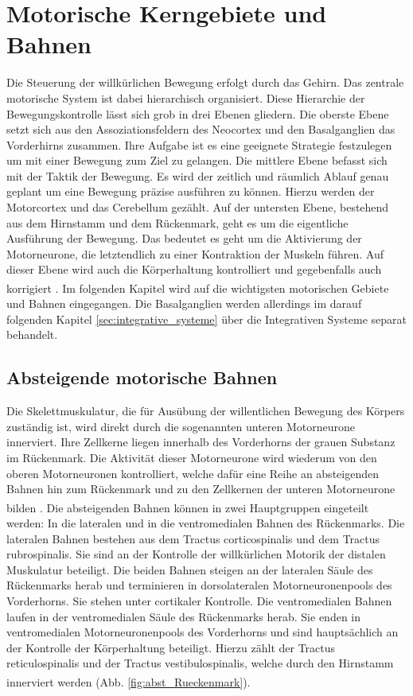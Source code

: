 \documentclass[12pt,a4paper,pdftex]{article}
\begin{document}
\newpage
\section{Motorische Kerngebiete und Bahnen}  \label{sec:Motorik}
Die Steuerung der willkürlichen Bewegung erfolgt durch das Gehirn. Das zentrale motorische System ist dabei hierarchisch organisiert. Diese Hierarchie der Bewegungskontrolle lässt sich grob in drei Ebenen gliedern. Die oberste Ebene setzt sich aus den Assoziationsfeldern des Neocortex und den Basalganglien das Vorderhirns zusammen. Ihre Aufgabe ist es eine geeignete Strategie festzulegen um mit einer Bewegung zum Ziel zu gelangen. Die mittlere Ebene befasst sich mit der Taktik der Bewegung. Es wird der zeitlich und räumlich Ablauf genau geplant um eine Bewegung präzise ausführen zu können. Hierzu werden der Motorcortex und das Cerebellum gezählt. Auf der untersten Ebene, bestehend aus dem Hirnstamm und dem Rückenmark, geht es um die eigentliche Ausführung der Bewegung. Das bedeutet es geht um die Aktivierung der Motorneurone, die letztendlich zu einer Kontraktion der Muskeln führen. Auf dieser Ebene wird auch die Körperhaltung kontrolliert und gegebenfalls auch korrigiert \textsuperscript{\cite[14]{neurowissenschaften_baer}}. Im folgenden Kapitel wird auf die wichtigsten motorischen Gebiete und Bahnen eingegangen. Die Basalganglien werden allerdings im darauf folgenden Kapitel \ref{sec:integrative_systeme} über die Integrativen Systeme separat behandelt.       

\subsection{Absteigende motorische Bahnen}
Die Skelettmuskulatur, die für Ausübung der willentlichen Bewegung des Körpers zuständig ist, wird direkt durch die sogenannten unteren Motorneurone innerviert. Ihre Zellkerne liegen innerhalb des Vorderhorns der grauen Substanz im Rückenmark. Die Aktivität dieser Motorneurone wird wiederum von den oberen Motorneuronen kontrolliert, welche dafür eine Reihe an absteigenden Bahnen hin zum Rückenmark und zu den Zellkernen der unteren Motorneurone bilden \textsuperscript{\cite[1]{crossman2014neuroanatomy}}. Die absteigenden Bahnen können in zwei Hauptgruppen eingeteilt werden: In die lateralen und in die ventromedialen Bahnen des Rückenmarks. Die lateralen Bahnen bestehen aus dem Tractus corticospinalis und dem Tractus rubrospinalis. Sie sind an der Kontrolle der willkürlichen Motorik der distalen Muskulatur beteiligt. Die beiden Bahnen steigen an der lateralen Säule des Rückenmarks herab und terminieren in dorsolateralen Motorneuronenpools des Vorderhorns. Sie stehen unter cortikaler Kontrolle. Die ventromedialen Bahnen laufen in der ventromedialen Säule des Rückenmarks herab. Sie enden in ventromedialen Motorneuronenpools des Vorderhorns und sind hauptsächlich an der Kontrolle der Körperhaltung beteiligt. Hierzu zählt der Tractus reticulospinalis und der Tractus vestibulospinalis, welche durch den Hirnstamm innerviert werden \textsuperscript{\cite[14]{neurowissenschaften_baer}} (Abb. \ref{fig:abst_Rueckenmark}). 
\end{document}
